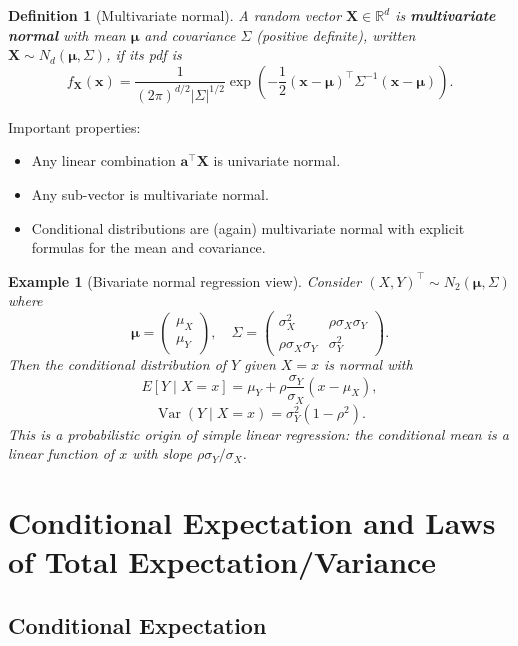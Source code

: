 \documentclass[11pt,a4paper]{article}
\newtheorem{definition}{Definition}[section]
\newtheorem{example}{Example}[section]
\begin{document}
\begin{definition}[Multivariate normal]
A random vector $\bm{X} \in \mathbb{R}^d$ is \textbf{multivariate normal} with mean $\bm{\mu}$ and covariance $\Sigma$ (positive definite), written $\bm{X} \sim N_d(\bm{\mu},\Sigma)$, if its pdf is
\[
f_{\bm{X}}(\bm{x}) =
\frac{1}{(2\pi)^{d/2} |\Sigma|^{1/2}}
\exp\left(
-\frac{1}{2}(\bm{x}-\bm{\mu})^\top \Sigma^{-1} (\bm{x}-\bm{\mu})
\right).
\]
\end{definition}

Important properties:
\begin{itemize}
    \item Any linear combination $\bm{a}^\top \bm{X}$ is univariate normal.
    \item Any sub-vector is multivariate normal.
    \item Conditional distributions are (again) multivariate normal with explicit formulas for the mean and covariance.
\end{itemize}

\begin{example}[Bivariate normal regression view]
Consider $(X,Y)^\top \sim N_2(\bm{\mu},\Sigma)$ where
\[
\bm{\mu} =
\begin{pmatrix}\mu_X \\ \mu_Y\end{pmatrix},
\quad
\Sigma = \begin{pmatrix}
\sigma_X^2 & \rho\sigma_X\sigma_Y\\
\rho\sigma_X\sigma_Y & \sigma_Y^2
\end{pmatrix}.
\]
Then the conditional distribution of $Y$ given $X=x$ is normal with
\[
E[Y \mid X=x] = \mu_Y + \rho\frac{\sigma_Y}{\sigma_X}(x-\mu_X),
\]
\[
\operatorname{Var}(Y \mid X=x) = \sigma_Y^2(1-\rho^2).
\]
This is a probabilistic origin of simple linear regression: the conditional mean is a linear function of $x$ with slope $\rho \sigma_Y /\sigma_X$.

\end{example}

\newpage

\section{Conditional Expectation and Laws of Total Expectation/Variance}

\subsection{Conditional Expectation}
\end{document}
